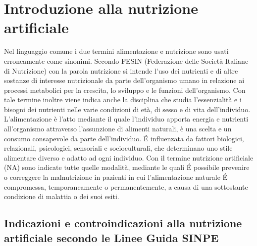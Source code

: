 \documentclass[12pt,a4paper,oneside]{book}
\begin{document}


\chapter{Introduzione alla nutrizione artificiale}
\label{sec:IntroduzioneAllaNutrizioneArtificiale}

Nel linguaggio comune i due termini alimentazione e nutrizione sono usati erroneamente come sinonimi. Secondo FESIN (Federazione delle Societ\`a Italiane di Nutrizione) con la parola nutrizione si intende l'uso dei nutrienti e di altre sostanze di interesse nutrizionale da parte dell'organismo umano in relazione ai processi metabolici per la crescita, lo sviluppo e le funzioni dell'organismo. Con tale termine inoltre viene indica anche la disciplina che studia l'essenzialit\`a e i bisogni dei nutrienti nelle varie condizioni di et\`a, di sesso e di vita dell'individuo. 
L'alimentazione \`e l'atto mediante il quale l'individuo apporta energia e nutrienti all'organismo attraverso l'assunzione di alimenti naturali, \`e una scelta e un consumo consapevole da parte dell'individuo. \'E influenzata da fattori biologici, relazionali, psicologici, sensoriali e socioculturali, che determinano uno stile alimentare diverso e adatto ad ogni individuo. 
Con il termine nutrizione artificiale (NA) sono indicate tutte quelle modalit\`a, mediante le quali \'E possibile prevenire o correggere la malnutrizione in pazienti in cui l'alimentazione naturale \'E compromessa, temporaneamente o permanentemente, a causa di una sottostante condizione di malattia o dei suoi esiti. 


\section{Indicazioni e controindicazioni alla nutrizione artificiale secondo le Linee Guida SINPE}
\end{document}
